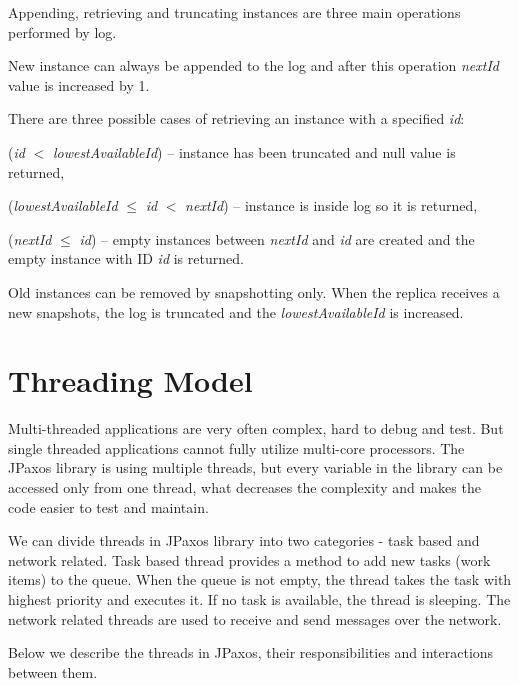 Appending, retrieving and truncating instances are three main operations per\-for\-med by log.

New instance can always be appended to the log and after this operation \textit{nextId} value is increased by 1. 

\noindent There are three possible cases of retrieving an instance with a specified \textit{id}:
\begin{tightList}
  \item[\textbullet] (\textit{id} $<$ \textit{lowestAvailableId}) -- instance has been truncated and null value is returned,
  \item[\textbullet] (\textit{lowestAvailableId} $\leq$ \textit{id} $<$ \textit{nextId}) -- instance is inside log so it is returned,
  \item[\textbullet] (\textit{nextId} $\leq$ \textit{id}) -- empty instances between \textit{nextId} and \textit{id} are created and the empty instance with ID \textit{id} is returned.
\end{tightList}

\noindent Old instances can be removed by snapshotting only. When the replica receives a new snapshots, the log is truncated and the \textit{lowestAvailableId} is increased.

\section{Threading Model}
\label{sec:threads}

Multi-threaded applications are very often complex, hard to debug and test. But single threaded applications cannot fully utilize multi-core processors. The JPaxos library is using multiple threads, but every variable in the library can be accessed only from one thread, what decreases the complexity and makes the code easier to test and maintain.

We can divide threads in JPaxos library into two categories - task based and
network related.
Task based thread provides a method to add new tasks (work
items) to the queue. When the queue is not empty, the thread takes the task
with highest priority and executes it. If no task is available, the thread is
sleeping. The network related threads are used to receive and send messages
over the network.

Below we describe the threads in JPaxos, their responsibilities and interactions between them. 

